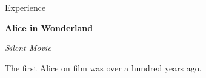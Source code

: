 \begin{rubric}{Experience}

		\textbf{Alice in Wonderland}\hfill
		\par
		\textit{Silent Movie}\par
    The first Alice on film was over a hundred years ago.
\end{rubric}
